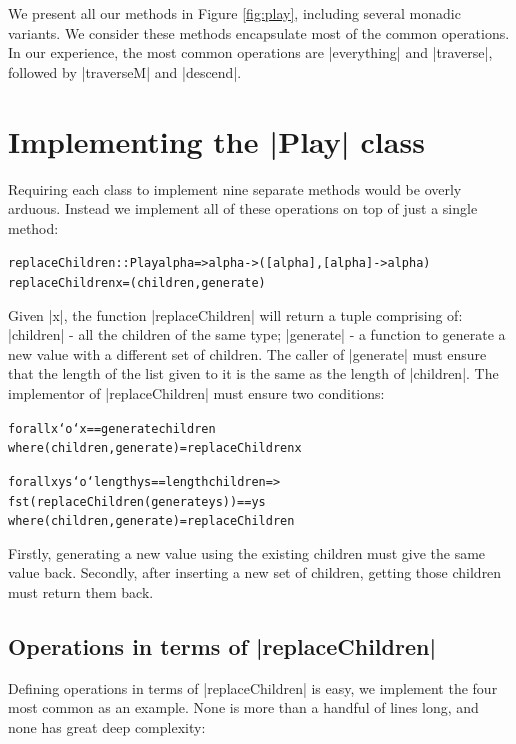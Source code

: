 \documentclass[preprint]{sigplanconf}
\newenvironment{code}{\begin{alltt}\small}{\end{alltt}}
\begin{document}
We present all our methods in Figure \ref{fig:play}, including several monadic variants. We consider these methods encapsulate most of the common operations. In our experience, the most common operations are |everything| and |traverse|, followed by |traverseM| and |descend|.


\section{Implementing the |Play| class}
\label{sec:implement_play}

Requiring each class to implement nine separate methods would be overly arduous. Instead we implement all of these operations on top of just a single method:

\begin{code}
replaceChildren :: Play alpha => alpha -> ([alpha], [alpha] -> alpha)
replaceChildren x = (children,generate)
\end{code}

Given |x|, the function |replaceChildren| will return a tuple comprising of: |children| - all the children of the same type; |generate| - a function to generate a new value with a different set of children. The caller of |generate| must ensure that the length of the list given to it is the same as the length of |children|. The implementor of |replaceChildren| must ensure two conditions:

\begin{code}
forall x `o` x == generate children
    where (children,generate) = replaceChildren x

forall x ys `o`  length ys == length children =>
                 fst (replaceChildren (generate ys)) == ys
    where (children,generate) = replaceChildren
\end{code}

Firstly, generating a new value using the existing children must give the same value back. Secondly, after inserting a new set of children, getting those children must return them back.


\subsection{Operations in terms of |replaceChildren|}

Defining operations in terms of |replaceChildren| is easy, we implement the four most common as an example. None is more than a handful of lines long, and none has great deep complexity:
\end{document}
